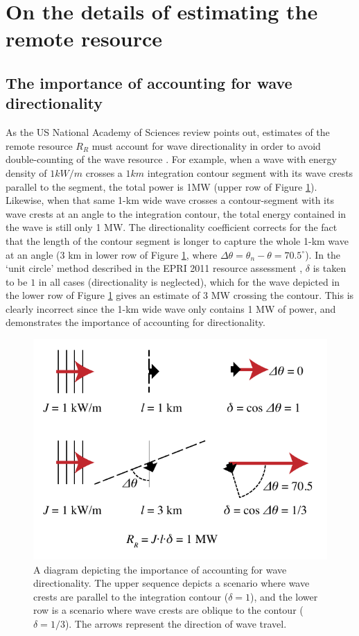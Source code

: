 \section{On the details of estimating the remote resource} \label{appendix:one-way-method}

\subsection{The importance of accounting for wave directionality}
\label{appendix:directionality}

As the US National Academy of Sciences review points out, estimates of the remote resource $R_R$ must account for wave directionality in order to avoid double-counting of the wave resource \citep{nationalresearchcouncilEvaluationDepartmentEnergy2013}. For example, when a wave with energy density of $1 \unit{kW/m}$ crosses a $1 \unit{km}$ integration contour segment with its wave crests parallel to the segment, the total power is 1MW (upper row of Figure \ref{fig:directionality}). Likewise, when that same 1-km wide wave crosses a contour-segment with its wave crests at an angle to the integration contour, the total energy contained in the wave is still only 1 MW. The directionality coefficient corrects for the fact that the length of the contour segment is longer to capture the whole 1-km wave at an angle (3 km in lower row of Figure \ref{fig:directionality}, where $\Delta\theta = \theta_n - \theta = 70.5^{\circ}$). In the `unit circle' method described in the EPRI 2011 resource assessment \citep{EPRIwaveresource2011}, $\delta$ is taken to be $1$ in all cases (directionality is neglected), which for the wave depicted in the lower row of Figure \ref{fig:directionality} gives an estimate of 3 MW crossing the contour. This is clearly incorrect since the 1-km wide wave only contains 1 MW of power, and demonstrates the importance of accounting for directionality.

\begin{figure}[ht]
    \centering
    \includegraphics[width=0.6 \linewidth]{../../diagram/Dot-Product_Schematic}
    \caption{A diagram depicting the importance of accounting for wave directionality. The upper sequence depicts a scenario where wave crests are parallel to the integration contour ($\delta = 1$), and the lower row is a scenario where wave crests are oblique to the contour ($\delta = 1/3$). The arrows represent the direction of wave travel.}
    \label{fig:directionality}
\end{figure}

